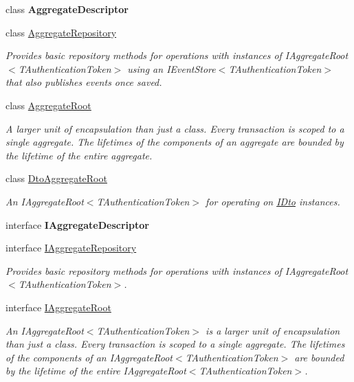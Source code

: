 \begin{DoxyCompactItemize}
\item 
class {\bfseries Aggregate\+Descriptor}
\item 
class \hyperlink{classCqrs_1_1Domain_1_1AggregateRepository}{Aggregate\+Repository}
\begin{DoxyCompactList}\small\item\em Provides basic repository methods for operations with instances of I\+Aggregate\+Root$<$\+T\+Authentication\+Token$>$ using an I\+Event\+Store$<$\+T\+Authentication\+Token$>$ that also publishes events once saved. \end{DoxyCompactList}\item 
class \hyperlink{classCqrs_1_1Domain_1_1AggregateRoot}{Aggregate\+Root}
\begin{DoxyCompactList}\small\item\em A larger unit of encapsulation than just a class. Every transaction is scoped to a single aggregate. The lifetimes of the components of an aggregate are bounded by the lifetime of the entire aggregate. \end{DoxyCompactList}\item 
class \hyperlink{classCqrs_1_1Domain_1_1DtoAggregateRoot}{Dto\+Aggregate\+Root}
\begin{DoxyCompactList}\small\item\em An I\+Aggregate\+Root$<$\+T\+Authentication\+Token$>$ for operating on \hyperlink{interfaceCqrs_1_1Domain_1_1IDto}{I\+Dto} instances. \end{DoxyCompactList}\item 
interface {\bfseries I\+Aggregate\+Descriptor}
\item 
interface \hyperlink{interfaceCqrs_1_1Domain_1_1IAggregateRepository}{I\+Aggregate\+Repository}
\begin{DoxyCompactList}\small\item\em Provides basic repository methods for operations with instances of I\+Aggregate\+Root$<$\+T\+Authentication\+Token$>$. \end{DoxyCompactList}\item 
interface \hyperlink{interfaceCqrs_1_1Domain_1_1IAggregateRoot}{I\+Aggregate\+Root}
\begin{DoxyCompactList}\small\item\em An I\+Aggregate\+Root$<$\+T\+Authentication\+Token$>$ is a larger unit of encapsulation than just a class. Every transaction is scoped to a single aggregate. The lifetimes of the components of an I\+Aggregate\+Root$<$\+T\+Authentication\+Token$>$ are bounded by the lifetime of the entire I\+Aggregate\+Root$<$\+T\+Authentication\+Token$>$. \end{DoxyCompactList}\item 

\end{DoxyCompactItemize}
